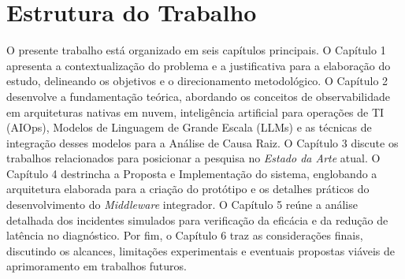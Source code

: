 \section{Estrutura do Trabalho}
O presente trabalho está organizado em seis capítulos principais. O Capítulo 1 apresenta a contextualização do problema e a justificativa para a elaboração do estudo, delineando os objetivos e o direcionamento metodológico. O Capítulo 2 desenvolve a fundamentação teórica, abordando os conceitos de observabilidade em arquiteturas nativas em nuvem, inteligência artificial para operações de TI (AIOps), Modelos de Linguagem de Grande Escala (LLMs) e as técnicas de integração desses modelos para a Análise de Causa Raiz. O Capítulo 3 discute os trabalhos relacionados para posicionar a pesquisa no \emph{Estado da Arte} atual. O Capítulo 4 destrincha a Proposta e Implementação do sistema, englobando a arquitetura elaborada para a criação do protótipo e os detalhes práticos do desenvolvimento do \emph{Middleware} integrador. O Capítulo 5 reúne a análise detalhada dos incidentes simulados para verificação da eficácia e da redução de latência no diagnóstico. Por fim, o Capítulo 6 traz as considerações finais, discutindo os alcances, limitações experimentais e eventuais propostas viáveis de aprimoramento em trabalhos futuros.



